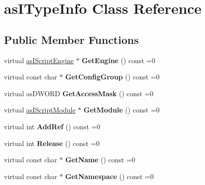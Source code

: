 \hypertarget{classas_i_type_info}{}\section{as\+I\+Type\+Info Class Reference}
\label{classas_i_type_info}
\subsection*{Public Member Functions}
\begin{DoxyCompactItemize}
\item 
\mbox{\label{classas_i_type_info_abafbb3a12cbd94f56a4f3c1739fd6ada}} 
virtual \hyperlink{classas_i_script_engine}{as\+I\+Script\+Engine} $\ast$ {\bfseries Get\+Engine} () const =0
\item 
\mbox{\label{classas_i_type_info_aa181c094c192e86299b394ebcfa68760}} 
virtual const char $\ast$ {\bfseries Get\+Config\+Group} () const =0
\item 
\mbox{\label{classas_i_type_info_a849e5890b225717b243c73e3d4f38204}} 
virtual as\+D\+W\+O\+RD {\bfseries Get\+Access\+Mask} () const =0
\item 
\mbox{\label{classas_i_type_info_a3e08d6c6ee1957c421bb297f94a81d54}} 
virtual \hyperlink{classas_i_script_module}{as\+I\+Script\+Module} $\ast$ {\bfseries Get\+Module} () const =0
\item 
\mbox{\label{classas_i_type_info_a532069932de1f584ab52e4c2afacf95e}} 
virtual int {\bfseries Add\+Ref} () const =0
\item 
\mbox{\label{classas_i_type_info_a73b9059dc335b6fde8c7bbf4b1b95914}} 
virtual int {\bfseries Release} () const =0
\item 
\mbox{\label{classas_i_type_info_a49f83d3a9158331029324bfbe9ae46a8}} 
virtual const char $\ast$ {\bfseries Get\+Name} () const =0
\item 
\mbox{\label{classas_i_type_info_a90b16019d2569d6c721130f3049786a2}} 
virtual const char $\ast$ {\bfseries Get\+Namespace} () const =0

\end{DoxyCompactItemize}
